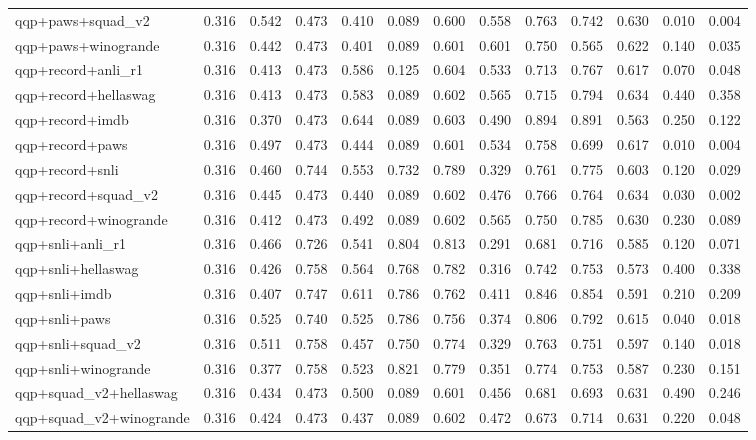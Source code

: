 \begin{table}[t]
\begin{tabular}{lrrrrrrrrrrrr}
    qqp+paws+squad\_v2 & 0.316 & 0.542 & 0.473 & 0.410 & 0.089 & 0.600 & 0.558 & 0.763 & 0.742 & 0.630 & 0.010 & 0.004 \\
    qqp+paws+winogrande & 0.316 & 0.442 & 0.473 & 0.401 & 0.089 & 0.601 & 0.601 & 0.750 & 0.565 & 0.622 & 0.140 & 0.035 \\
    qqp+record+anli\_r1 & 0.316 & 0.413 & 0.473 & 0.586 & 0.125 & 0.604 & 0.533 & 0.713 & 0.767 & 0.617 & 0.070 & 0.048 \\
    qqp+record+hellaswag & 0.316 & 0.413 & 0.473 & 0.583 & 0.089 & 0.602 & 0.565 & 0.715 & 0.794 & 0.634 & 0.440 & 0.358 \\
    qqp+record+imdb & 0.316 & 0.370 & 0.473 & 0.644 & 0.089 & 0.603 & 0.490 & 0.894 & 0.891 & 0.563 & 0.250 & 0.122 \\
    qqp+record+paws & 0.316 & 0.497 & 0.473 & 0.444 & 0.089 & 0.601 & 0.534 & 0.758 & 0.699 & 0.617 & 0.010 & 0.004 \\
    qqp+record+snli & 0.316 & 0.460 & 0.744 & 0.553 & 0.732 & 0.789 & 0.329 & 0.761 & 0.775 & 0.603 & 0.120 & 0.029 \\
    qqp+record+squad\_v2 & 0.316 & 0.445 & 0.473 & 0.440 & 0.089 & 0.602 & 0.476 & 0.766 & 0.764 & 0.634 & 0.030 & 0.002 \\
    qqp+record+winogrande & 0.316 & 0.412 & 0.473 & 0.492 & 0.089 & 0.602 & 0.565 & 0.750 & 0.785 & 0.630 & 0.230 & 0.089 \\
    qqp+snli+anli\_r1 & 0.316 & 0.466 & 0.726 & 0.541 & 0.804 & 0.813 & 0.291 & 0.681 & 0.716 & 0.585 & 0.120 & 0.071 \\
    qqp+snli+hellaswag & 0.316 & 0.426 & 0.758 & 0.564 & 0.768 & 0.782 & 0.316 & 0.742 & 0.753 & 0.573 & 0.400 & 0.338 \\
    qqp+snli+imdb & 0.316 & 0.407 & 0.747 & 0.611 & 0.786 & 0.762 & 0.411 & 0.846 & 0.854 & 0.591 & 0.210 & 0.209 \\
    qqp+snli+paws & 0.316 & 0.525 & 0.740 & 0.525 & 0.786 & 0.756 & 0.374 & 0.806 & 0.792 & 0.615 & 0.040 & 0.018 \\
    qqp+snli+squad\_v2 & 0.316 & 0.511 & 0.758 & 0.457 & 0.750 & 0.774 & 0.329 & 0.763 & 0.751 & 0.597 & 0.140 & 0.018 \\
    qqp+snli+winogrande & 0.316 & 0.377 & 0.758 & 0.523 & 0.821 & 0.779 & 0.351 & 0.774 & 0.753 & 0.587 & 0.230 & 0.151 \\
    qqp+squad\_v2+hellaswag & 0.316 & 0.434 & 0.473 & 0.500 & 0.089 & 0.601 & 0.456 & 0.681 & 0.693 & 0.631 & 0.490 & 0.246 \\
    qqp+squad\_v2+winogrande & 0.316 & 0.424 & 0.473 & 0.437 & 0.089 & 0.602 & 0.472 & 0.673 & 0.714 & 0.631 & 0.220 & 0.048 \\

\end{tabular}
\end{table}
